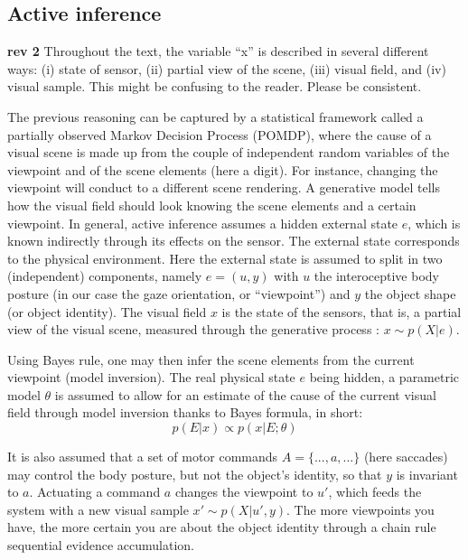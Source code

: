 \subsection*{Active inference}

{\color{blue} {\bf rev 2} Throughout the text, the variable “x” is described in several different ways: (i) state of sensor, (ii)  partial view of the scene, (iii) visual field, and (iv) visual sample. This might be confusing to the reader. Please be consistent.}

The previous reasoning can be captured by a statistical framework called a
partially observed Markov Decision Process (POMDP), where the cause of a visual scene is  made up from the couple of independent random variables of the viewpoint and of the scene elements (here a digit). For instance, changing the viewpoint will conduct to a different scene rendering.
A generative model tells how the visual field should look knowing the scene elements and a certain viewpoint.
In general, active inference assumes a hidden external state $e$, which is known indirectly through its effects on the sensor. The external state corresponds to the physical environment. Here the external state is assumed to split in two (independent) components, namely $e = (u,y)$ with $u$ the interoceptive body posture (in our case the gaze orientation, or ``viewpoint'') and $y$ the object shape (or object identity). The visual field $x$ is the state of the sensors, that is, a partial view of the visual scene, measured through the generative process : $x\sim p(X|e)$.


Using Bayes rule, one may then infer the scene elements from the current viewpoint (model inversion).
 The real physical state $e$ being hidden, a parametric model $\theta$ is assumed to allow for an estimate of the cause of the current visual field through model inversion thanks to Bayes formula, in short:
$$p(E|x) \propto p(x|E;\theta)$$


It is also assumed that a set of motor commands $A = \{..., a, ...\}$ (here saccades) may control the body posture, but not the object's identity, so that $y$ is invariant to $a$. Actuating a command $a$ changes the viewpoint to $u'$, which feeds the system with a new visual sample $x'\sim p(X|u', y)$. The more viewpoints you have, the more certain you are about the object identity through a chain rule sequential evidence accumulation.

